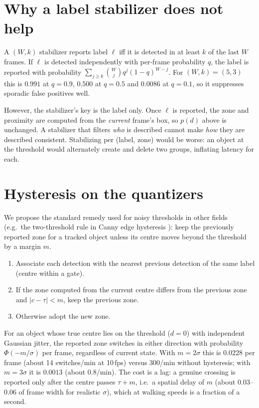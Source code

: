 \documentclass[11pt,a4paper]{article}
\begin{document}
\section{Why a label stabilizer does not help}\label{sec:stabilizer}
A $(W,k)$ stabilizer reports label $\ell$ iff it is detected in at least $k$ of the last $W$ frames. If $\ell$ is detected independently with per-frame probability $q$, the label is reported with probability $\sum_{j\ge k}\binom{W}{j}q^{j}(1-q)^{W-j}$. For $(W,k)=(5,3)$ this is $0.991$ at $q=0.9$, $0.500$ at $q=0.5$ and $0.0086$ at $q=0.1$, so it suppresses sporadic false positives well.

However, the stabilizer's key is the label only. Once $\ell$ is reported, the zone and proximity are computed from the \emph{current} frame's box, so $p(d)$ above is unchanged. A stabilizer that filters \emph{who} is described cannot make \emph{how} they are described consistent. Stabilizing per (label, zone) would be worse: an object at the threshold would alternately create and delete two groups, inflating latency for each.

\section{Hysteresis on the quantizers}\label{sec:hyst}
We propose the standard remedy used for noisy thresholds in other fields (e.g.\ the two-threshold rule in Canny edge hysteresis \cite{canny1986}): keep the previously reported zone for a tracked object unless its centre moves beyond the threshold by a margin $m$.

\begin{enumerate}[nosep]
  \item Associate each detection with the nearest previous detection of the same label (centre within a gate).
  \item If the zone computed from the current centre differs from the previous zone and $|c-\tau|<m$, keep the previous zone.
  \item Otherwise adopt the new zone.
\end{enumerate}
For an object whose true centre lies on the threshold ($d=0$) with independent Gaussian jitter, the reported zone switches in either direction with probability $\Phi(-m/\sigma)$ per frame, regardless of current state. With $m=2\sigma$ this is $0.0228$ per frame (about 14 switches/min at 10\,fps) versus 300/min without hysteresis; with $m=3\sigma$ it is $0.0013$ (about 0.8/min). The cost is a lag: a genuine crossing is reported only after the centre passes $\tau+m$, i.e.\ a spatial delay of $m$ (about $0.03$--$0.06$ of frame width for realistic $\sigma$), which at walking speeds is a fraction of a second.
\end{document}
